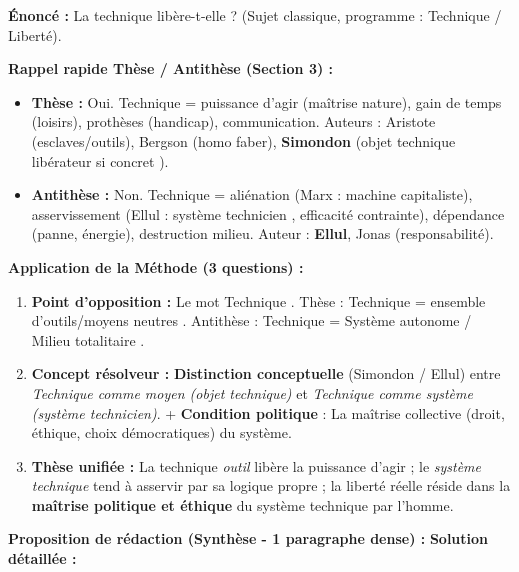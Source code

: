 \documentclass[11pt]{article}
\begin{document}
\begin{exoresolu}
\textbf{Énoncé :} \og{} La technique libère-t-elle ? \fg{} (Sujet classique, programme : Technique / Liberté).

\textbf{Rappel rapide Thèse / Antithèse (Section 3) :}
\begin{itemize}
    \item \textbf{Thèse :} Oui. Technique = puissance d'agir (maîtrise nature), gain de temps (loisirs), prothèses (handicap), communication. Auteurs : Aristote (esclaves/outils), Bergson (homo faber), \textbf{Simondon} (objet technique libérateur si \og{} concret \fg{}).
    \item \textbf{Antithèse :} Non. Technique = aliénation (Marx : machine capitaliste), asservissement (Ellul : \og{} système technicien \fg{}, efficacité contrainte), dépendance (panne, énergie), destruction milieu. Auteur : \textbf{Ellul}, Jonas (responsabilité).
\end{itemize}

\textbf{Application de la Méthode (3 questions) :}
\begin{enumerate}
    \item \textbf{Point d'opposition :} Le mot \og{} Technique \fg{}. Thèse : \og{} Technique = ensemble d'outils/moyens neutres \fg{}. Antithèse : \og{} Technique = Système autonome / Milieu totalitaire \fg{}.
    \item \textbf{Concept résolveur :} \textbf{Distinction conceptuelle} (Simondon / Ellul) entre \emph{Technique comme moyen (objet technique)} et \emph{Technique comme système (système technicien)}. + \textbf{Condition politique} : La maîtrise collective (droit, éthique, choix démocratiques) du système.
    \item \textbf{Thèse unifiée :} \og{} La technique \emph{outil} libère la puissance d'agir ; le \emph{système technique} tend à asservir par sa logique propre ; la liberté réelle réside dans la \textbf{maîtrise politique et éthique} du système technique par l'homme. \fg{}
\end{enumerate}

\textbf{Proposition de rédaction (Synthèse - 1 paragraphe dense) :}
\tcblower
\textbf{Solution détaillée :}


\end{exoresolu}
\end{document}
